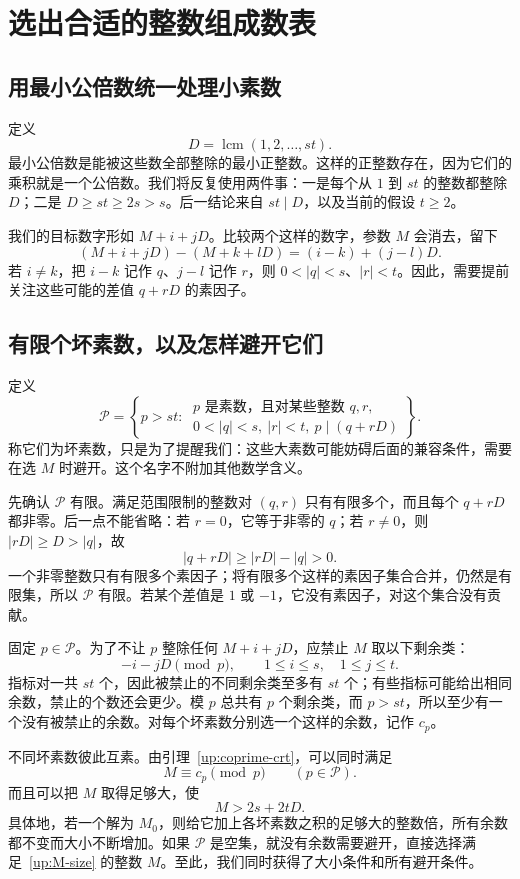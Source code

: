 \documentclass[UTF8,a4paper,oneside,openany,fontset=fandol,zihao=-4]{ctexbook}
\theoremstyle{guide}
\DeclareMathOperator{\lcm}{lcm}
\begin{document}
\section{选出合适的整数组成数表}\label{up:construction}

\subsection{用最小公倍数统一处理小素数}

定义
\[
D=\lcm(1,2,\ldots,st).
\]
最小公倍数是能被这些数全部整除的最小正整数。这样的正整数存在，因为它们的乘积就是一个公倍数。我们将反复使用两件事：一是每个从 $1$ 到 $st$ 的整数都整除 $D$；二是 $D\geq st\geq2s>s$。后一结论来自 $st\mid D$，以及当前的假设 $t\geq2$。

我们的目标数字形如 $M+i+jD$。比较两个这样的数字，参数 $M$ 会消去，留下
\[
(M+i+jD)-(M+k+lD)=(i-k)+(j-l)D.
\]
若 $i\ne k$，把 $i-k$ 记作 $q$、$j-l$ 记作 $r$，则 $0<|q|<s$、$|r|<t$。因此，需要提前关注这些可能的差值 $q+rD$ 的素因子。

\subsection{有限个坏素数，以及怎样避开它们}

定义
\[
\mathcal P=\left\{p>st:\ \begin{array}{l}
p\text{ 是素数，且对某些整数 }q,r,\\
0<|q|<s,\ |r|<t,\ p\mid(q+rD)
\end{array}\right\}.
\]
称它们为坏素数，只是为了提醒我们：这些大素数可能妨碍后面的兼容条件，需要在选 $M$ 时避开。这个名字不附加其他数学含义。

先确认 $\mathcal P$ 有限。满足范围限制的整数对 $(q,r)$ 只有有限多个，而且每个 $q+rD$ 都非零。后一点不能省略：若 $r=0$，它等于非零的 $q$；若 $r\ne0$，则 $|rD|\geq D>|q|$，故
\[
|q+rD|\geq |rD|-|q|>0.
\]
一个非零整数只有有限多个素因子；将有限多个这样的素因子集合合并，仍然是有限集，所以 $\mathcal P$ 有限。若某个差值是 $1$ 或 $-1$，它没有素因子，对这个集合没有贡献。

固定 $p\in\mathcal P$。为了不让 $p$ 整除任何 $M+i+jD$，应禁止 $M$ 取以下剩余类：
\[
-i-jD\pmod p,\qquad 1\leq i\leq s,\quad 1\leq j\leq t.
\]
指标对一共 $st$ 个，因此被禁止的不同剩余类至多有 $st$ 个；有些指标可能给出相同余数，禁止的个数还会更少。模 $p$ 总共有 $p$ 个剩余类，而 $p>st$，所以至少有一个没有被禁止的余数。对每个坏素数分别选一个这样的余数，记作 $c_p$。

不同坏素数彼此互素。由引理~\ref{up:coprime-crt}，可以同时满足
\[
M\equiv c_p\pmod p\qquad(p\in\mathcal P).
\]
而且可以把 $M$ 取得足够大，使
\begin{equation}\label{up:M-size}
M>2s+2tD.
\end{equation}
具体地，若一个解为 $M_0$，则给它加上各坏素数之积的足够大的整数倍，所有余数都不变而大小不断增加。如果 $\mathcal P$ 是空集，就没有余数需要避开，直接选择满足~\eqref{up:M-size} 的整数 $M$。至此，我们同时获得了大小条件和所有避开条件。
\end{document}
